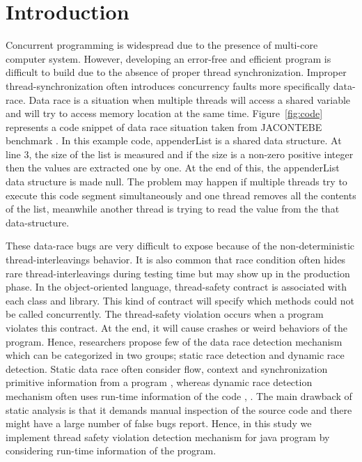\section{Introduction}
\label{sec:intro}

Concurrent programming is widespread due to the presence of multi-core computer
system. However, developing an error-free and efficient program is difficult to
build due to the absence of proper thread synchronization. Improper
thread-synchronization often introduces concurrency faults more specifically
data-race. Data race is a situation when multiple threads will access a shared
variable and will try to access memory location at the same time.
Figure~\ref{fig:code} represents a code snippet of data race situation taken
from JACONTEBE benchmark \cite{lin2015jacontebe}. In this example code, appenderList is a
shared data structure. At line 3, the size of the list is measured and if the
size is a non-zero positive integer then the values are extracted one by one.
At the end of this, the appenderList data structure is made null. The problem
may happen if multiple threads try to execute this code segment simultaneously
and one thread removes all the contents of the list, meanwhile another thread
is trying to read the value from the that data-structure.    

These data-race bugs are very difficult to expose because of the
non-deterministic thread-interleavings behavior. It is also common that race
condition often hides rare thread-interleavings during testing time but may
show up in the production phase. In the object-oriented language, thread-safety
contract is associated with each class and library. This kind of contract will
specify which methods could not be called concurrently. The thread-safety
violation occurs when a program violates this contract. At the end, it will
cause crashes or weird behaviors of the program.  Hence, researchers propose
few of the data race detection mechanism which can be categorized in two
groups; static race detection and dynamic race detection. Static data race
often consider flow, context and synchronization primitive information from a
program \cite{kahlon2009ESEC}, \cite{naik2006PLDI} whereas dynamic race
detection mechanism often uses run-time information of the code
\cite{pozniansky2007multirace}, \cite{li2019efficient}.   The main drawback of
static analysis is that it demands manual inspection of the source code and
there might have a large number of false bugs report. Hence, in this study we
implement thread safety violation detection mechanism for java program by
considering run-time information of the program. 

